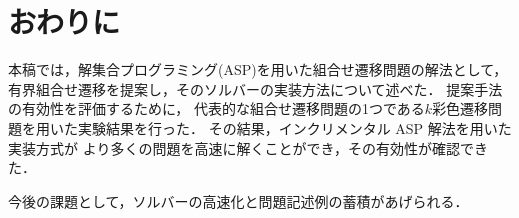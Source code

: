 ﻿%
\section{おわりに}\label{chap:conclusion}

本稿では，解集合プログラミング(ASP)を用いた組合せ遷移問題の解法として，
有界組合せ遷移を提案し，そのソルバーの実装方法について述べた．
提案手法の有効性を評価するために，
代表的な組合せ遷移問題の1つである$k$彩色遷移問題を用いた実験結果を行った．
その結果，インクリメンタル ASP 解法を用いた実装方式が
より多くの問題を高速に解くことができ，その有効性が確認できた．

今後の課題として，ソルバーの高速化と問題記述例の蓄積があげられる．


